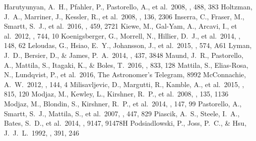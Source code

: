 \documentclass[twocolumn]{aastex61}
\begin{document}
\begin{thebibliography}{}
 Harutyunyan, A.~H., Pfahler, P., Pastorello, A., et al.\ 2008, \aap, 488, 383 
 Holtzman, J.~A., Marriner, J., Kessler, R., et al.\ 2008, \aj, 136, 2306 
 Inserra, C., Fraser, M., Smartt, S.~J., et al.\ 2016, \mnras, 459, 2721 
 Kiewe, M., Gal-Yam, A., Arcavi, I., et al.\ 2012, \apj, 744, 10 
 Koenigsberger, G., Morrell, N., Hillier, D.~J., et al.\ 2014, \aj, 148, 62 
 Leloudas, G., Hsiao, E.~Y., Johansson, J., et al.\ 2015, \aap, 574, A61 
 Lyman, J.~D., Bersier, D., \& James, P.~A.\ 2014, \mnras, 437, 3848 
 Maund, J.~R., Pastorello, A., Mattila, S., Itagaki, K., \& Boles, T.\ 2016, \apj, 833, 128 
 Mattila, S., Elias-Rosa, N., Lundqvist, P., et al.\ 2016, The Astronomer's Telegram, 8992
 McConnachie, A.~W.\ 2012, \aj, 144, 4 
 Milisavljevic, D., Margutti, R., Kamble, A., et al.\ 2015, \apj, 815, 120 
 Modjaz, M., Kewley, L., Kirshner, R.~P., et al.\ 2008, \aj, 135, 1136 
 Modjaz, M., Blondin, S., Kirshner, R.~P., et al.\ 2014, \aj, 147, 99  
 Pastorello, A., Smartt, S.~J., Mattila, S., et al.\ 2007, \nat, 447, 829 
 Piascik, A.~S., Steele, I.~A., Bates, S.~D., et al.\ 2014, \procspie, 9147, 91478H 
 Podsiadlowski, P., Joss, P.~C., \& Hsu, J.~J.~L.\ 1992, \apj, 391, 246 

\end{thebibliography}
\end{document}
